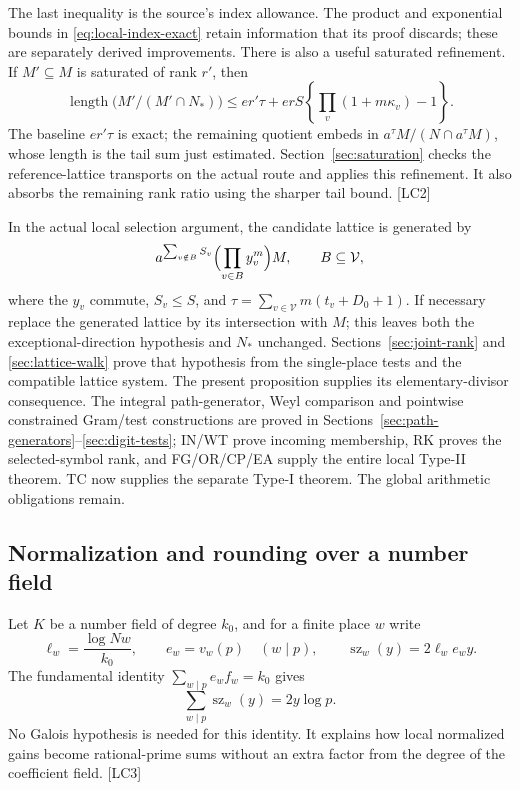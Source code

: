 \documentclass[11pt,a4paper]{article}
\numberwithin{equation}{section}
\theoremstyle{remark}\newtheorem{remark}[theorem]{Remark}
\begin{document}
The last inequality is the source's index allowance. The product and exponential bounds in \eqref{eq:local-index-exact} retain information that its proof discards; these are separately derived improvements. There is also a useful saturated refinement. If $M'\subseteq M$ is saturated of rank $r'$, then
\[
\operatorname{length}\bigl(M'/(M'\cap N_*)\bigr)
\le er'\tau+erS\left\{\prod_v(1+m\kappa_v)-1\right\}.
\]
The baseline $er'\tau$ is exact; the remaining quotient embeds in $a^\tau M/(N\cap a^\tau M)$, whose length is the tail sum just estimated. Section~\ref{sec:saturation} checks the reference-lattice transports on the actual route and applies this refinement. It also absorbs the remaining rank ratio using the sharper tail bound. \textsf{[LC2]}

In the actual local selection argument, the candidate lattice is generated by
\[
a^{\sum_{v\notin B}S_v}\Bigl(\prod_{v\in B}y_v^m\Bigr)M,
\qquad B\subseteq\mathcal V,
\]
where the $y_v$ commute, $S_v\le S$, and
$\tau=\sum_{v\in\mathcal V}m(t_v+D_0+1)$. If necessary replace the generated lattice by its intersection with $M$; this leaves both the exceptional-direction hypothesis and $N_*$ unchanged. Sections~\ref{sec:joint-rank} and \ref{sec:lattice-walk} prove that hypothesis from the single-place tests and the compatible lattice system. The present proposition supplies its elementary-divisor consequence. The integral path-generator, Weyl comparison and pointwise constrained Gram/test constructions are proved in Sections~\ref{sec:path-generators}--\ref{sec:digit-tests}; IN/WT prove incoming membership, RK proves the selected-symbol rank, and FG/OR/CP/EA supply the entire local Type-II theorem. TC now supplies the separate Type-I theorem. The global arithmetic obligations remain.\cite{local-systems}

\subsection{Normalization and rounding over a number field}

Let $K$ be a number field of degree $k_0$, and for a finite place $w$ write
\[
\ell_w=\frac{\log Nw}{k_0},\qquad e_w=v_w(p)\quad(w\mid p),
\qquad \operatorname{sz}_w(y)=2\ell_w e_w y.
\]
The fundamental identity $\sum_{w\mid p}e_w f_w=k_0$ gives
\begin{equation}\label{eq:prime-normalization}
\sum_{w\mid p}\operatorname{sz}_w(y)=2y\log p.
\end{equation}
No Galois hypothesis is needed for this identity. It explains how local normalized gains become rational-prime sums without an extra factor from the degree of the coefficient field. \textsf{[LC3]}\cite{local-normalization}
\end{document}

